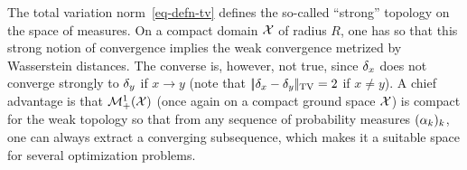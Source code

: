 \begin{rem}
		The total variation norm~\eqref{eq-defn-tv} defines the so-called ``strong'' topology on the space of measures.
	On a compact domain $\mathcal{X}$ of radius $R$, one has
	so that this strong notion of convergence implies the weak convergence metrized by Wasserstein distances.
	The converse is, however, not true, since $\delta_x$ does not converge strongly to $\delta_y$ if $x \rightarrow y$ (note that
	$|\!| \delta_x-\delta_y |\!|_{\operatorname{TV}}=2$ if $x \neq y$).
	A chief advantage is that $\mathcal{M}_+^1(\mathcal{X})$ (once again on a compact ground space $\mathcal{X}$) is compact for the weak topology so that from any sequence of probability measures $(\alpha_k)_k$, one can always extract a converging subsequence, which makes it a suitable space for several optimization problems.
\end{rem}

